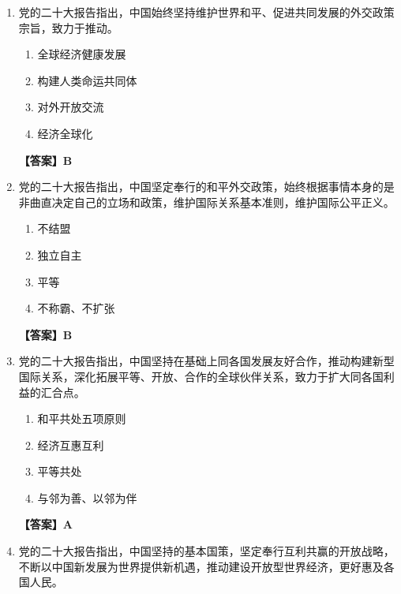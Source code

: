 \documentclass[UTF8,11pt,a4paper]{ctexart}
\begin{document}
\begin{enumerate}[label=\textbf{\arabic*.}, leftmargin=2.5em, itemsep=0.7em]
\begin{enumerate}[label=\Alph*., leftmargin=2em, itemsep=0.1em, topsep=0.15em]
\item 两岸关系和平发展
\item 团结广大台湾同胞
\end{enumerate}
\textbf{【答案】A}
\item 党的二十大报告指出，中国始终坚持维护世界和平、促进共同发展的外交政策宗旨，致力于推动\allowbreak\underline{\hspace{4em}}。
\begin{enumerate}[label=\Alph*., leftmargin=2em, itemsep=0.1em, topsep=0.15em]
\item 全球经济健康发展
\item 构建人类命运共同体
\item 对外开放交流
\item 经济全球化
\end{enumerate}
\textbf{【答案】B}
\item 党的二十大报告指出，中国坚定奉行\allowbreak\underline{\hspace{4em}}的和平外交政策，始终根据事情本身的是非曲直决定自己的立场和政策，维护国际关系基本准则，维护国际公平正义。
\begin{enumerate}[label=\Alph*., leftmargin=2em, itemsep=0.1em, topsep=0.15em]
\item 不结盟
\item 独立自主
\item 平等
\item 不称霸、不扩张
\end{enumerate}
\textbf{【答案】B}
\item 党的二十大报告指出，中国坚持在\allowbreak\underline{\hspace{4em}}基础上同各国发展友好合作，推动构建新型国际关系，深化拓展平等、开放、合作的全球伙伴关系，致力于扩大同各国利益的汇合点。
\begin{enumerate}[label=\Alph*., leftmargin=2em, itemsep=0.1em, topsep=0.15em]
\item 和平共处五项原则
\item 经济互惠互利
\item 平等共处
\item 与邻为善、以邻为伴
\end{enumerate}
\textbf{【答案】A}
\item 党的二十大报告指出，中国坚持\allowbreak\underline{\hspace{4em}}的基本国策，坚定奉行互利共赢的开放战略，不断以中国新发展为世界提供新机遇，推动建设开放型世界经济，更好惠及各国人民。
\begin{enumerate}[label=\Alph*., leftmargin=2em, itemsep=0.1em, topsep=0.15em]

\end{enumerate}
\end{enumerate}
\end{document}
